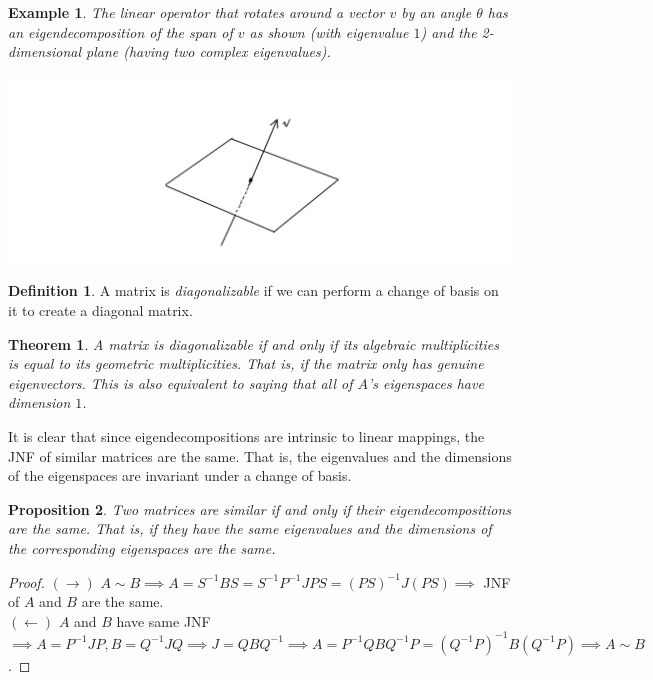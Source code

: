 \documentclass{article}
\newtheorem{theorem}{Theorem}[section]
\newtheorem{proposition}[theorem]{Proposition}
\newtheorem{example}{Example}[section]
\theoremstyle{remark}
\theoremstyle{definition}
\newtheorem{definition}{Definition}[section]
\begin{document}
    \begin{example}
    The linear operator that rotates around a vector $v$ by an angle $\theta$ has an eigendecomposition of the span of $v$ as shown (with eigenvalue $1$) and the 2-dimensional plane (having two complex eigenvalues). 
    \begin{center}
        \includegraphics[scale=0.25]{img/Rotation_Map_Eigendecomposition.PNG}
    \end{center}
    \end{example}

    \begin{definition}
    A matrix is \textit{diagonalizable} if we can perform a change of basis on it to create a diagonal matrix. 
    \end{definition}

    \begin{theorem}
    A matrix is diagonalizable if and only if its algebraic multiplicities is equal to its geometric multiplicities. That is, if the matrix only has genuine eigenvectors. This is also equivalent to saying that all of $A$'s eigenspaces have dimension $1$. 
    \end{theorem}

    It is clear that since eigendecompositions are intrinsic to linear mappings, the JNF of similar matrices are the same. That is, the eigenvalues and the dimensions of the eigenspaces are invariant under a change of basis. 

    \begin{proposition}
    Two matrices are similar if and only if their eigendecompositions are the same. That is, if they have the same eigenvalues and the dimensions of the corresponding eigenspaces are the same. 
    \end{proposition}

    \begin{proof}
    $(\rightarrow)$ $A \sim B \implies A = S^{-1} B S = S^{-1} P^{-1} J P S = (PS)^{-1} J (PS) \implies$ JNF of $A$ and $B$ are the same.  \\
    $(\leftarrow)$ $A$ and $B$ have same JNF $\implies A = P^{-1} J P, B = Q^{-1} J Q \implies J = Q B Q^{-1} \implies A = P^{-1} Q B Q^{-1} P = (Q^{-1} P)^{-1} B (Q^{-1} P) \implies A \sim B$. 
    \end{proof}
\end{document}
